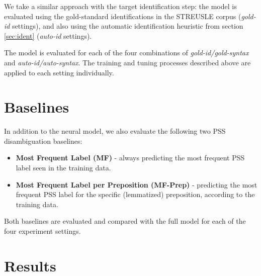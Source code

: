 We take a similar approach with the target identification step: the model is evaluated using the gold-standard identifications in the STREUSLE corpus (\textit{gold-id} settings), and also using the automatic identification heuristic from section \ref{sec:ident} (\textit{auto-id} settings).

The model is evaluated for each of the four combinations of \textit{gold-id/gold-syntax} and \textit{auto-id/auto-syntax}. The training and tuning processes described above are applied to each setting individually.

\section{Baselines} \label{sec:pssbaselines}

In addition to the neural model, we also evaluate the following two PSS disambiguation baselines:

\begin{itemize}
    \item \textbf{Most Frequent Label (MF)} - always predicting the most frequent PSS label seen in the training data.
    \item \textbf{Most Frequent Label per Preposition (MF-Prep)} - predicting the most frequent PSS label for the specific (lemmatized) preposition, according to the training data.
\end{itemize}

Both baselines are evaluated and compared with the full model for each of the four experiment settings. 

\section{Results} \label{sec:pssresults}

